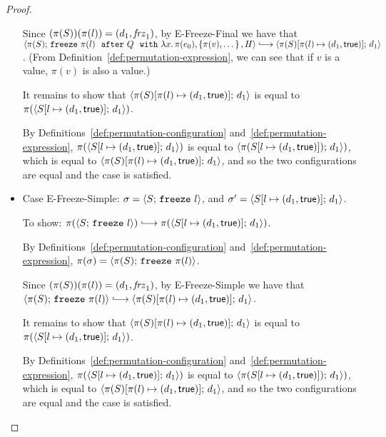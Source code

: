 \begin{proof}
\begin{itemize}
      Since $(\pi(S))(\pi(l)) = (d_1, \mathit{frz}_1)$, by {\sc
        E-Freeze-Final} we have that
      $\config{\pi(S)}{\freezeafterfull{\pi(l)}{Q}{\lam{x}{\pi(e_0)}}{\setof{\pi(v),
            \dots}}{H}} \parstepsto
      \config{\extS{\pi(S)}{\pi(l)}{d_1}{\frozentrue}}{d_1}$.  (From
      Definition~\ref{def:permutation-expression}, we can see that if
      $v$ is a value, $\pi(v)$ is also a value.)

      It remains to show that
      $\langle \pi(S)[\pi(l) \mapsto (d_1, \textsf{true})];\, d_1 \rangle$ is equal
      to $\pi(\langle S[l \mapsto (d_1, \textsf{true})];\, d_1 \rangle)$.

      By Definitions~\ref{def:permutation-configuration}
      and~\ref{def:permutation-expression},
      $\pi(\langle S[l \mapsto (d_1, \textsf{true})];\, d_1 \rangle)$ is equal to
      $\langle \pi(S[l \mapsto (d_1, \textsf{true})]);\, d_1 \rangle)$, which is
      equal to
      $\langle \pi(S)[\pi(l) \mapsto (d_1, \textsf{true})];\, d_1 \rangle$, and so
      the two configurations are equal and the case is satisfied.

    \item Case {\sc E-Freeze-Simple}: $\sigma =
      \langle S;\, \mbox{\texttt{freeze}}~l \rangle$, and $\sigma' =
      \langle S[l \mapsto (d_1, \textsf{true})];\, d_1 \rangle$.

      To show: $\pi(\config{S}{\freeze{l}}) \parstepsto
      \pi(\config{\extS{S}{l}{d_1}{\frozentrue}}{d_1})$.

      By Definitions~\ref{def:permutation-configuration}
      and~\ref{def:permutation-expression}, $\pi(\sigma) =
      \langle \pi(S);\, \mbox{\texttt{freeze}}~\pi(l) \rangle$.

      Since $(\pi(S))(\pi(l)) = (d_1, \mathit{frz}_1)$, by {\sc
        E-Freeze-Simple} we have that
      $\config{\pi(S)}{\freeze{\pi(l)}} \parstepsto
      \config{\extS{\pi(S)}{\pi(l)}{d_1}{\frozentrue}}{d_1}$.

      It remains to show that
      $\langle \pi(S)[\pi(l) \mapsto (d_1, \textsf{true})];\, d_1 \rangle$ is equal
      to $\pi(\langle S[l \mapsto (d_1, \textsf{true})];\, d_1 \rangle)$.

      By Definitions~\ref{def:permutation-configuration}
      and~\ref{def:permutation-expression},
      $\pi(\langle S[l \mapsto (d_1, \textsf{true})];\, d_1 \rangle)$ is equal to
      $\langle \pi(S[l \mapsto (d_1, \textsf{true})]);\, d_1 \rangle)$, which is
      equal to
      $\langle \pi(S)[\pi(l) \mapsto (d_1, \textsf{true})];\, d_1 \rangle$, and so
      the two configurations are equal and the case is satisfied.

  \end{itemize}


\end{proof}
